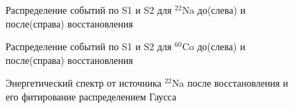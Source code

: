 \begin{figure}[H]
	\caption{Распределение событий по S1 и S2 для $^{22}$Na до(слева) и после(справа) восстановления}
  \label{img:s1s2na}  
\end{figure}

\begin{figure}[H]
	\caption{Распределение событий по S1 и S2 для $^{60}$Co до(слева) и после(справа) восстановления}
  \label{img:s1s2co}  
\end{figure}

\begin{figure}[H]
  \caption{Энергетический спектр от источника $^{22}$Na после восстановления и его фитирование распределением Гаусса}
  \label{img:spectrNa}  
\end{figure}

